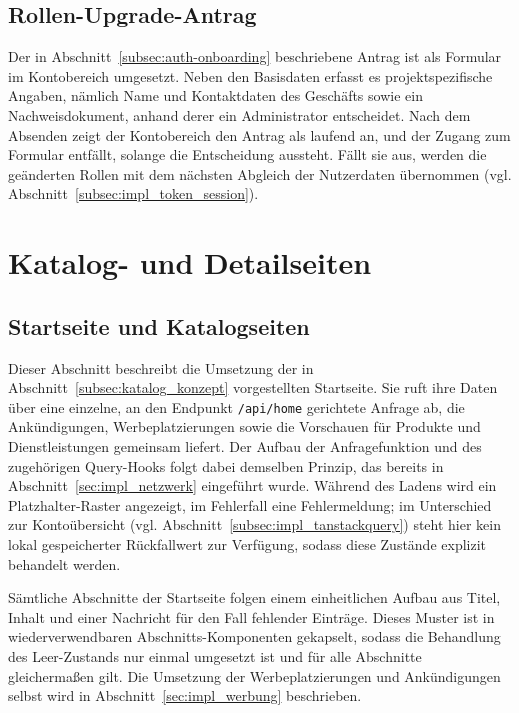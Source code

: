 \subsection{Rollen-Upgrade-Antrag}
\label{subsec:impl_rollen_upgrade}

Der in Abschnitt~\ref{subsec:auth-onboarding} beschriebene Antrag ist
als Formular im Kontobereich umgesetzt. Neben den Basisdaten erfasst
es projektspezifische Angaben, nämlich Name und Kontaktdaten des
Geschäfts sowie ein Nachweisdokument, anhand derer ein Administrator
entscheidet. Nach dem Absenden zeigt der Kontobereich den Antrag als
laufend an, und der Zugang zum Formular entfällt, solange die
Entscheidung aussteht. Fällt sie aus, werden die geänderten Rollen
mit dem nächsten Abgleich der Nutzerdaten übernommen (vgl.
Abschnitt~\ref{subsec:impl_token_session}).

\section{Katalog- und Detailseiten}
\label{sec:impl_katalog}

\subsection{Startseite und Katalogseiten}
\label{subsec:impl_produktlisting}

Dieser Abschnitt beschreibt die Umsetzung der in
Abschnitt~\ref{subsec:katalog_konzept} vorgestellten Startseite.
Sie ruft ihre Daten über eine einzelne, an den Endpunkt
\texttt{/api/home} gerichtete Anfrage ab, die Ankündigungen,
Werbeplatzierungen sowie die Vorschauen für Produkte und
Dienstleistungen gemeinsam liefert. Der Aufbau der
Anfragefunktion und des zugehörigen Query-Hooks folgt dabei
demselben Prinzip, das bereits in
Abschnitt~\ref{sec:impl_netzwerk} eingeführt wurde. Während des
Ladens wird ein Platzhalter-Raster angezeigt, im Fehlerfall eine
Fehlermeldung; im Unterschied zur Kontoübersicht (vgl.
Abschnitt~\ref{subsec:impl_tanstackquery}) steht hier kein
lokal gespeicherter Rückfallwert zur Verfügung, sodass diese
Zustände explizit behandelt werden.

Sämtliche Abschnitte der Startseite folgen einem einheitlichen
Aufbau aus Titel, Inhalt und einer Nachricht für den Fall
fehlender Einträge. Dieses Muster ist in wiederverwendbaren
Abschnitts-Komponenten gekapselt, sodass die Behandlung des
Leer-Zustands nur einmal umgesetzt ist und für alle Abschnitte
gleichermaßen gilt. Die Umsetzung der Werbeplatzierungen und
Ankündigungen selbst wird in
Abschnitt~\ref{sec:impl_werbung} beschrieben.

